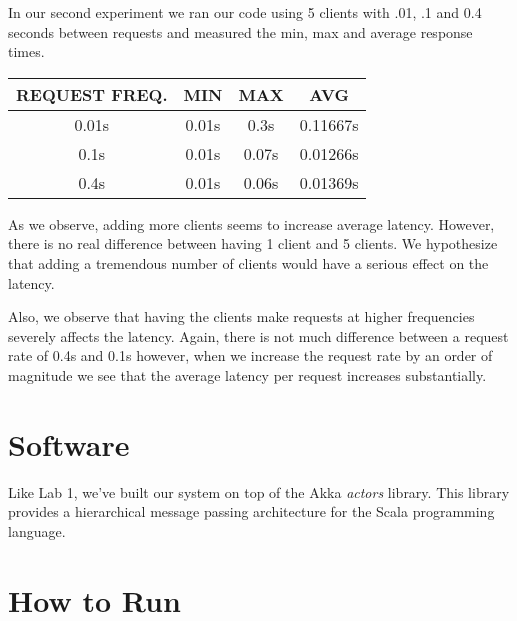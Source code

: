 \documentclass[11pt]{article}
\begin{document}
In our second experiment we ran our code using 5 clients with .01, .1
and 0.4 seconds between requests and measured the min, max and
average response times.


\begin{tabular}{c|c|c|c}
  REQUEST FREQ. & MIN & MAX & AVG \\
  \hline
  0.01s & 0.01s & 0.3s  & 0.11667s \\
  0.1s  & 0.01s & 0.07s & 0.01266s \\
  0.4s  & 0.01s & 0.06s & 0.01369s \\
\end{tabular}

As we observe, adding more clients seems to increase average
latency.  However, there is no real difference between having 1 client
and 5 clients.  We hypothesize that adding a tremendous number of
clients would have a serious effect on the latency.

Also, we observe that having the clients make requests at higher
frequencies severely affects the latency.  Again, there is not much
difference between a request rate of 0.4s and 0.1s however, when we
increase the request rate by an order of magnitude we see that the
average latency per request increases substantially.

\section{Software}
Like Lab 1, we've built our system on top of the Akka \emph{actors}
library.  This library provides a hierarchical message passing
architecture for the Scala programming language.

\section{How to Run}
\end{document}
